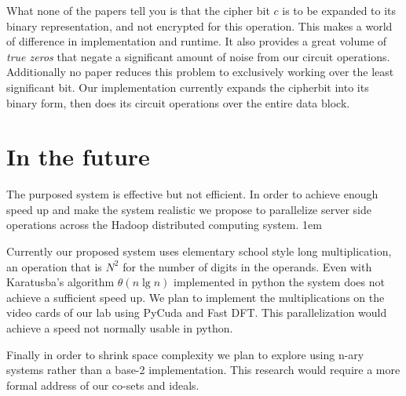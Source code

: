 \documentclass[letterpaper,11pt]{article} %
\begin{document}
What none of the papers tell you is that the cipher bit \(c\) is to be expanded to its binary representation, and not encrypted for this operation. This makes a world of difference in implementation and runtime. It also provides a great volume of {\em true zeros } that negate a significant amount of noise from our circuit operations. Additionally no paper reduces this problem to exclusively working over the least significant bit. Our implementation currently expands the cipherbit into its binary form, then does its circuit operations over the entire data block. 



\section*{In the future}
\hspace{1em}The purposed system is effective but not efficient. In order to achieve enough speed up and make the system realistic we propose to parallelize server side operations across the Hadoop distributed computing system.
\parskip 1em

\hspace{1em}Currently our proposed system uses elementary school style long multiplication, an operation that is \(N^2\) for the number of digits in the operands. Even with Karatusba's algorithm \(\theta( n \lg n)\) implemented in python the system does not achieve a sufficient speed up. We plan to implement the multiplications on the video cards of our lab using PyCuda and Fast DFT. This parallelization would achieve a speed not normally usable in python.


\hspace{1em}Finally in order to shrink space complexity we plan to explore using n-ary systems rather than a base-2 implementation. This research would require a more formal address of our co-sets and ideals.
\end{document}
